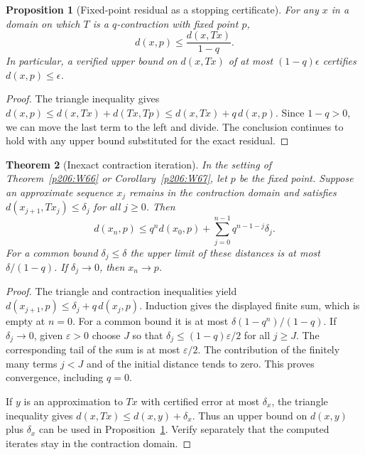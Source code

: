 \documentclass[11pt,oneside,openany]{book}
\theoremstyle{plain}
\newtheorem{theorem}{Theorem}[chapter]
\newtheorem{proposition}[theorem]{Proposition}
\theoremstyle{definition}
\theoremstyle{remark}
\begin{document}
\begin{proposition}[Fixed-point residual as a stopping certificate]\label{p206:W70}
For any \(x\) in a domain on which \(T\) is a \(q\)-contraction
with fixed point \(p\),
\[
 d(x,p)\le \frac{d(x,Tx)}{1-q}.
\]
In particular, a verified upper bound on \(d(x,Tx)\) of at most
\((1-q)\epsilon\) certifies \(d(x,p)\le\epsilon\).
\end{proposition}
\begin{proof}
The triangle inequality gives
\(d(x,p)\le d(x,Tx)+d(Tx,Tp)\le d(x,Tx)+q\,d(x,p)\).
Since \(1-q>0\), we can move the last term to the left and divide.
The conclusion continues to hold with any upper bound substituted
for the exact residual.
\end{proof}

\begin{theorem}[Inexact contraction iteration]\label{p206:W71}
In the setting of Theorem~\ref{p206:W66} or
Corollary~\ref{p206:W67}, let \(p\) be the fixed point.
Suppose an approximate sequence \(x_j\) remains in the contraction
domain and satisfies \(d(x_{j+1},Tx_j)\le\delta_j\) for all \(j\ge0\).
Then
\[
 d(x_n,p)\le q^n d(x_0,p)+
             \sum_{j=0}^{n-1}q^{n-1-j}\delta_j .
\]
For a common bound \(\delta_j\le\delta\) the upper limit of these
distances is at most \(\delta/(1-q)\). If \(\delta_j\to0\), then
\(x_n\to p\).
\end{theorem}
\begin{proof}
The triangle and contraction inequalities yield
\(d(x_{j+1},p)\le\delta_j+q\,d(x_j,p)\). Induction gives the
displayed finite sum, which is empty at \(n=0\). For a common
bound it is at most \(\delta(1-q^n)/(1-q)\). If \(\delta_j\to0\),
given \(\varepsilon>0\) choose \(J\) so that \(\delta_j\le
(1-q)\varepsilon/2\) for all \(j\ge J\). The corresponding tail
of the sum is at most \(\varepsilon/2\). The contribution of the
finitely many terms \(j<J\) and of the initial distance tends to
zero. This proves convergence, including \(q=0\).

If \(y\) is an approximation to \(Tx\) with certified error at most
\(\delta_x\), the triangle inequality gives
\(d(x,Tx)\le d(x,y)+\delta_x\).
Thus an upper bound on \(d(x,y)\) plus \(\delta_x\) can be used
in Proposition~\ref{p206:W70}. Verify separately that the computed
iterates stay in the contraction domain.
\end{proof}
\end{document}
